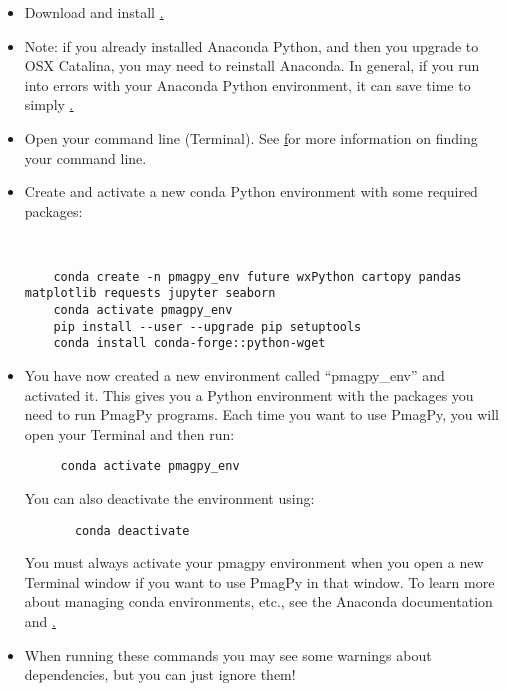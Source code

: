 \documentclass[11pt]{article}
\begin{document}
\begin{itemize}
\item Download and install \href{https://urldefense.proofpoint.com/v2/url?u=https-3A__www.anaconda.com_download-257D-257BAnaconda&d=DwIGAg&c=-35OiAkTchMrZOngvJPOeA&r=HLmFoB00cDyPMQ7s6Fl35Q&m=9TB00hCAaShZt5cteDvwqhnCi3nTUrwrqW7n_PywH0XvmSc18bYYYeEFO5tqVczP&s=ENpPtJAjCpNHYtnmLp_LRXgHRjiPAS8aKu8PVoPzdwY&e=  Python 3}.
  \item Note: if you already installed Anaconda Python, and then you upgrade to OSX Catalina, you may need to reinstall Anaconda.  In general, if you run into errors with your Anaconda Python environment, it can save time to simply \href{https://urldefense.proofpoint.com/v2/url?u=https-3A__docs.anaconda.com_anaconda_install_uninstall_-257D-257Buninstall&d=DwIGAg&c=-35OiAkTchMrZOngvJPOeA&r=HLmFoB00cDyPMQ7s6Fl35Q&m=9TB00hCAaShZt5cteDvwqhnCi3nTUrwrqW7n_PywH0XvmSc18bYYYeEFO5tqVczP&s=LBudYOOJBv4mTmKq3b8qVgQG8z2NDhgE2XO03GyBFXo&e=  and reinstall}.
   \item Open your command line (Terminal).  See \href{https://earthref.org/PmagPy/cookbook/#command_line%7D%7Bthis Cookbook section} for more information on finding your command line.
   \item Create and activate a new conda Python environment with some required packages: \begin{verbatim}
   

    conda create -n pmagpy_env future wxPython cartopy pandas matplotlib requests jupyter seaborn
    conda activate pmagpy_env
    pip install --user --upgrade pip setuptools
    conda install conda-forge::python-wget
\end{verbatim}
   \item You have now created a new environment called ``pmagpy\_env'' and activated it.  This gives you a Python environment with the packages you need to run PmagPy programs.  Each time you want to use PmagPy, you will open your Terminal and then run:

     \begin{verbatim}
     conda activate pmagpy_env
\end{verbatim}
     You can also deactivate the environment using:

     \begin{verbatim}
       conda deactivate
       \end{verbatim}

     You must always activate your pmagpy environment when you open a new Terminal window if you want to use PmagPy in that window.  To learn more about managing conda environments, etc., see the Anaconda documentation and \href{https://urldefense.proofpoint.com/v2/url?u=https-3A__know.continuum.io_rs_387-2DXNW-2D688_images_conda-2Dcheatsheet.pdf-257D-257Bcheatsheet&d=DwIGAg&c=-35OiAkTchMrZOngvJPOeA&r=HLmFoB00cDyPMQ7s6Fl35Q&m=9TB00hCAaShZt5cteDvwqhnCi3nTUrwrqW7n_PywH0XvmSc18bYYYeEFO5tqVczP&s=iipiccA7iYU7HeiVxN53TNt8byw3p4SLtTEGsdhVDhY&e= }.
   \item When running these commands you may see some warnings about dependencies, but you can just ignore them!


\end{itemize}
\end{document}
